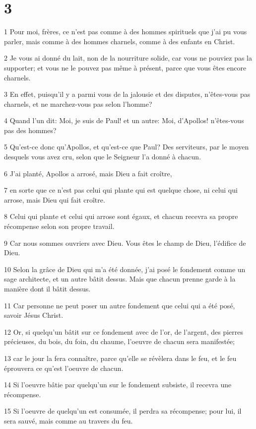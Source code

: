 \chapter{3}

\par 1 Pour moi, frères, ce n'est pas comme à des hommes spirituels que j'ai pu vous parler, mais comme à des hommes charnels, comme à des enfants en Christ.
\par 2 Je vous ai donné du lait, non de la nourriture solide, car vous ne pouviez pas la supporter; et vous ne le pouvez pas même à présent, parce que vous êtes encore charnels.
\par 3 En effet, puisqu'il y a parmi vous de la jalousie et des disputes, n'êtes-vous pas charnels, et ne marchez-vous pas selon l'homme?
\par 4 Quand l'un dit: Moi, je suis de Paul! et un autre: Moi, d'Apollos! n'êtes-vous pas des hommes?
\par 5 Qu'est-ce donc qu'Apollos, et qu'est-ce que Paul? Des serviteurs, par le moyen desquels vous avez cru, selon que le Seigneur l'a donné à chacun.
\par 6 J'ai planté, Apollos a arrosé, mais Dieu a fait croître,
\par 7 en sorte que ce n'est pas celui qui plante qui est quelque chose, ni celui qui arrose, mais Dieu qui fait croître.
\par 8 Celui qui plante et celui qui arrose sont égaux, et chacun recevra sa propre récompense selon son propre travail.
\par 9 Car nous sommes ouvriers avec Dieu. Vous êtes le champ de Dieu, l'édifice de Dieu.
\par 10 Selon la grâce de Dieu qui m'a été donnée, j'ai posé le fondement comme un sage architecte, et un autre bâtit dessus. Mais que chacun prenne garde à la manière dont il bâtit dessus.
\par 11 Car personne ne peut poser un autre fondement que celui qui a été posé, savoir Jésus Christ.
\par 12 Or, si quelqu'un bâtit sur ce fondement avec de l'or, de l'argent, des pierres précieuses, du bois, du foin, du chaume, l'oeuvre de chacun sera manifestée;
\par 13 car le jour la fera connaître, parce qu'elle se révèlera dans le feu, et le feu éprouvera ce qu'est l'oeuvre de chacun.
\par 14 Si l'oeuvre bâtie par quelqu'un sur le fondement subsiste, il recevra une récompense.
\par 15 Si l'oeuvre de quelqu'un est consumée, il perdra sa récompense; pour lui, il sera sauvé, mais comme au travers du feu.
